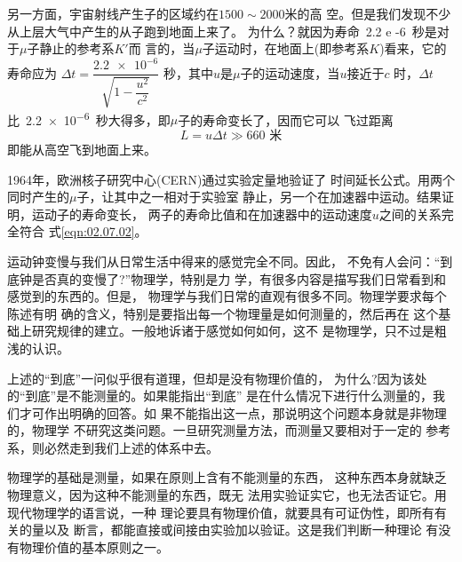 另一方面，宇宙射线产生子的区域约在$1500\sim2000$米的高
空。但是我们发现不少从上层大气中产生的从子跑到地面上来了。
为什么？就因为寿命~\num{2.2 e -6}~秒是对于$\mu$子静止的参考系$K'$而
言的，当$\mu$子运动时，在地面上(即参考系$K$)看来，它的寿命应为
$\Delta t = \dfrac { \num{2.2e-6}}{ \sqrt { 1 - \dfrac { u ^ 2 } { c ^ { 2 } } } }$
秒，其中$u$是$\mu$子的运动速度，当$u$接近于$c$
时，$\Delta t$比~\num{2.2e-6}~秒大得多，即$\mu$子的寿命变长了，因而它可以
飞过距离
\begin{equation*}
    L = u \Delta t \gg 660 \text{ 米}
\end{equation*}
即能从高空飞到地面上来。

1964年，欧洲核子研究中心(CERN)通过实验定量地验证了
时间延长公式。用两个同时产生的$\mu$子，让其中之一相对于实验室
静止，另一个在加速器中运动。结果证明，运动子的寿命变长，
两子的寿命比值和在加速器中的运动速度$u$之间的关系完全符合
式\eqref{eqn:02.07.02}。

运动钟变慢与我们从日常生活中得来的感觉完全不同。因此，
不免有人会问：“到底钟是否真的变慢了?”物理学，特别是力
学，有很多内容是描写我们日常看到和感觉到的东西的。但是，
物理学与我们日常的直观有很多不同。物理学要求每个陈述有明
确的含义，特别是要指出每一个物理量是如何测量的，然后再在
这个基础上研究规律的建立。一般地诉诸于感觉如何如何，这不
是物理学，只不过是粗浅的认识。

\clearpage
上述的“到底”一问似乎很有道理，但却是没有物理价值的，
为什么?因为该处的“到底”是不能测量的。如果能指出“到底”
是在什么情况下进行什么测量的，我们才可作出明确的回答。如
果不能指出这一点，那说明这个问题本身就是非物理的，物理学
不研究这类问题。一旦研究测量方法，而测量又要相对于一定的
参考系，则必然走到我们上述的体系中去。

物理学的基础是测量，如果在原则上含有不能测量的东西，
这种东西本身就缺乏物理意义，因为这种不能测量的东西，既无
法用实验证实它，也无法否证它。用现代物理学的语言说，一种
理论要具有物理价值，就要具有可证伪性，即所有有关的量以及
断言，都能直接或间接由实验加以验证。这是我们判断一种理论
有没有物理价值的基本原则之一。